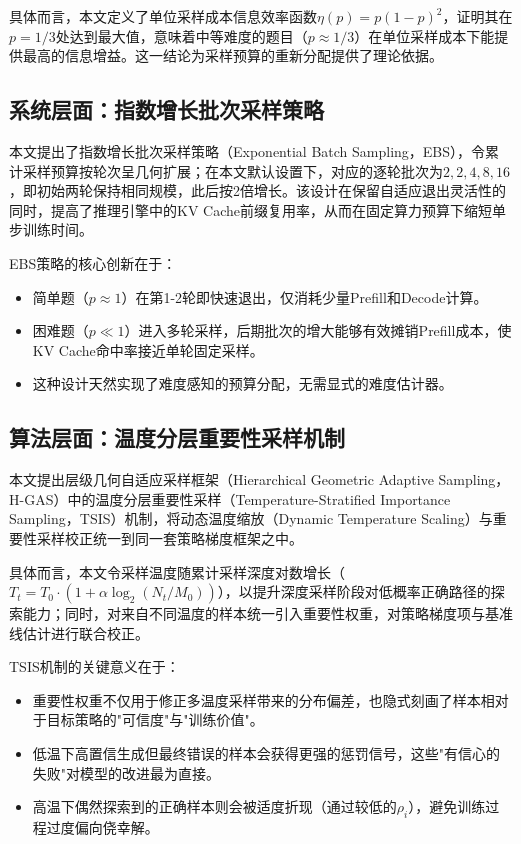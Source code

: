 具体而言，本文定义了单位采样成本信息效率函数$\eta(p) = p(1-p)^2$，证明其在$p=1/3$处达到最大值，意味着中等难度的题目（$p \approx 1/3$）在单位采样成本下能提供最高的信息增益。这一结论为采样预算的重新分配提供了理论依据。

\subsection{系统层面：指数增长批次采样策略}
\label{subsec:system_contribution}

本文提出了指数增长批次采样策略（Exponential Batch Sampling，EBS），令累计采样预算按轮次呈几何扩展；在本文默认设置下，对应的逐轮批次为$2, 2, 4, 8, 16$，即初始两轮保持相同规模，此后按2倍增长。该设计在保留自适应退出灵活性的同时，提高了推理引擎中的KV Cache前缀复用率，从而在固定算力预算下缩短单步训练时间。

EBS策略的核心创新在于：
\begin{itemize}
    \item 简单题（$p \approx 1$）在第1-2轮即快速退出，仅消耗少量Prefill和Decode计算。
    \item 困难题（$p \ll 1$）进入多轮采样，后期批次的增大能够有效摊销Prefill成本，使KV Cache命中率接近单轮固定采样。
    \item 这种设计天然实现了难度感知的预算分配，无需显式的难度估计器。
\end{itemize}

\subsection{算法层面：温度分层重要性采样机制}
\label{subsec:algorithm_contribution}

本文提出层级几何自适应采样框架（Hierarchical Geometric Adaptive Sampling，H-GAS）中的温度分层重要性采样（Temperature-Stratified Importance Sampling，TSIS）机制，将动态温度缩放（Dynamic Temperature Scaling）与重要性采样校正统一到同一套策略梯度框架之中。

具体而言，本文令采样温度随累计采样深度对数增长（$T_t = T_0 \cdot (1 + \alpha \log_2(N_t / M_0))$），以提升深度采样阶段对低概率正确路径的探索能力；同时，对来自不同温度的样本统一引入重要性权重，对策略梯度项与基准线估计进行联合校正。

TSIS机制的关键意义在于：
\begin{itemize}
    \item 重要性权重不仅用于修正多温度采样带来的分布偏差，也隐式刻画了样本相对于目标策略的"可信度"与"训练价值"。
    \item 低温下高置信生成但最终错误的样本会获得更强的惩罚信号，这些"有信心的失败"对模型的改进最为直接。
    \item 高温下偶然探索到的正确样本则会被适度折现（通过较低的$\rho_i$），避免训练过程过度偏向侥幸解。
\end{itemize}

